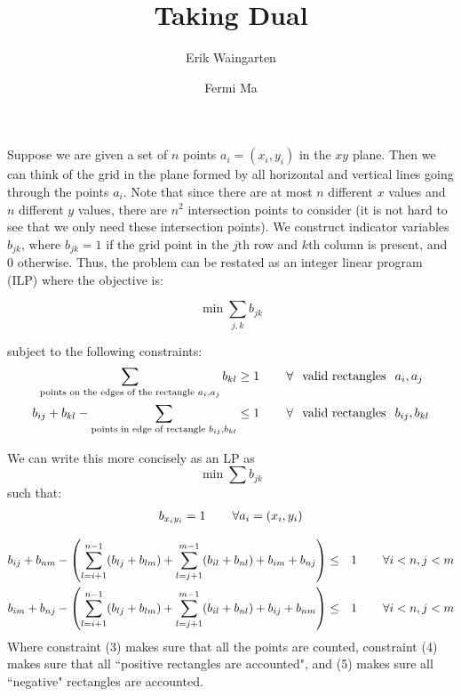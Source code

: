 \documentclass[11pt]{article}
\author{Erik Waingarten \and Fermi Ma}
\title{Taking Dual}
\begin{document}
         
\maketitle

Suppose we are given a set of $n$ points $a_i = (x_i, y_i)$ in the $xy$ plane. Then we can think of the grid in the plane formed by all horizontal and vertical lines going through the points $a_i$. Note that since there are at most $n$ different $x$ values and $n$ different $y$ values, there are $n^2$ intersection points to consider (it is not hard to see that we only need these intersection points). We construct indicator variables $b_{jk}$, where $b_{jk} = 1$ if the grid point in the $j$th row and $k$th column is present, and 0 otherwise. Thus, the problem can be restated as an integer linear program (ILP) where the objective is:

\[ \min \sum_{j,k} b_{jk} \]

subject to the following constraints:
\begin{align}
\sum_{\text{points on the edges of the rectangle }a_i, a_j} b_{kl} &\geq 1 \hspace{.3in} \forall \hspace{.1in} \text{valid rectangles} \hspace{.1in} a_i, a_j\\
b_{ij} + b_{kl} - \sum_{\text{points in edge of rectangle }b_{ij}, b_{kl}} &\leq 1 \hspace{.3in}  \forall \hspace{.1in} \text{valid rectangles} \hspace{.1in} b_{ij}, b_{kl}
\end{align}

We can write this more concisely as an LP as
\[ \min \sum b_{jk} \]
such that:
\begin{align}
 b_{x_iy_i} = 1 \hspace{.3in} \forall a_i = (x_i, y_i)
\end{align}

\begin{align}
b_{ij} + b_{nm} - \left(\sum_{l=i+1}^{n-1} (b_{lj}+b_{lm}) + \sum_{l=j+1}^{m-1} (b_{il} + b_{nl}) + b_{im} + b_{nj} \right) &\leq& 1 & \hspace{.3in} \forall i<n, j<m \\
b_{im} + b_{nj} - \left(\sum_{l=i+1}^{n-1} (b_{lj}+b_{lm}) + \sum_{l=j+1}^{m-1} (b_{il} + b_{nl}) + b_{ij} + b_{nm} \right) &\leq& 1 & \hspace{.3in} \forall i<n, j<m
\end{align}
Where constraint (3) makes sure that all the points are counted, constraint (4) makes sure that all ``positive rectangles are accounted", and (5) makes sure all ``negative" rectangles are accounted. 
\end{document}

